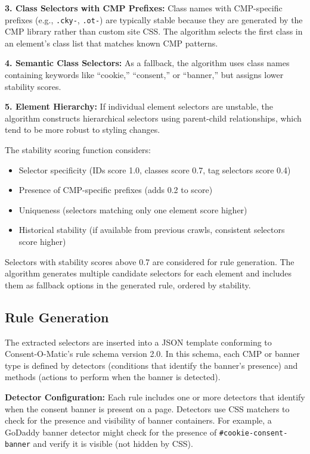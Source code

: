 \documentclass[conference]{IEEEtran}
\begin{document}
\textbf{3. Class Selectors with CMP Prefixes:} Class names with CMP-specific prefixes (e.g., \texttt{.cky-}, \texttt{.ot-}) are typically stable because they are generated by the CMP library rather than custom site CSS. The algorithm selects the first class in an element's class list that matches known CMP patterns.

\textbf{4. Semantic Class Selectors:} As a fallback, the algorithm uses class names containing keywords like ``cookie,'' ``consent,'' or ``banner,'' but assigns lower stability scores.

\textbf{5. Element Hierarchy:} If individual element selectors are unstable, the algorithm constructs hierarchical selectors using parent-child relationships, which tend to be more robust to styling changes.

The stability scoring function considers:

\begin{itemize}

    \item Selector specificity (IDs score 1.0, classes score 0.7, tag selectors score 0.4)

    \item Presence of CMP-specific prefixes (adds 0.2 to score)

    \item Uniqueness (selectors matching only one element score higher)

    \item Historical stability (if available from previous crawls, consistent selectors score higher)

\end{itemize}

Selectors with stability scores above 0.7 are considered for rule generation. The algorithm generates multiple candidate selectors for each element and includes them as fallback options in the generated rule, ordered by stability.

\subsection{Rule Generation}

The extracted selectors are inserted into a JSON template conforming to Consent-O-Matic's rule schema version 2.0. In this schema, each CMP or banner type is defined by detectors (conditions that identify the banner's presence) and methods (actions to perform when the banner is detected).

\textbf{Detector Configuration:} Each rule includes one or more detectors that identify when the consent banner is present on a page. Detectors use CSS matchers to check for the presence and visibility of banner containers. For example, a GoDaddy banner detector might check for the presence of \texttt{\#cookie-consent-banner} and verify it is visible (not hidden by CSS).
\end{document}
